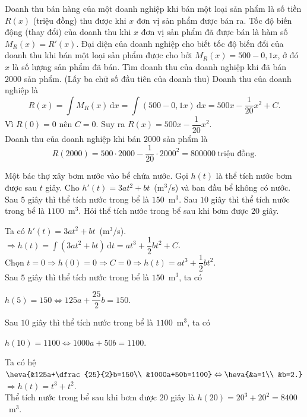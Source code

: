 \begin{ex}%
Doanh thu bán hàng của một doanh nghiệp khi bán một loại sản phẩm là số tiền $R(x)$ (triệu đồng) thu được khi $x$ đơn vị sản phẩm được bán ra. Tốc độ biến động (thay đổi) của doanh thu khi $x$	đơn vị sản phẩm đã được bán là hàm số $M_R(x)=R'(x)$. Đại diện của doanh nghiệp cho biết tốc độ biến đổi của doanh thu khi bán một loại sản phẩm được cho bởi $M_R(x)=500-0{,}1x$, ở đó $x$ là số lượng sản phẩm đã bán. Tìm doanh thu của doanh nghiệp khi đã bán $2000$ sản phẩm. (Lấy ba chữ số đầu tiên của doanh thu)
\loigiai
{
	Doanh thu của doanh nghiệp là $$R(x)=\displaystyle\int M_R(x)\mathrm{\,d}x =\displaystyle\int (500-0{,}1x)\mathrm{\,d}x =500x-\dfrac{1}{20}x^2+C.$$
	Vì $R(0)=0$ nên $C=0$. Suy ra $R(x)=500x-\dfrac{1}{20}x^2$.\\
	Doanh thu của doanh nghiệp khi bán $2000$ sản phẩm là $$R(2000)=500\cdot2000-\dfrac{1}{20}\cdot2000^2=800000~\text{triệu đồng.}$$
}
\end{ex}

\begin{ex}%
Một bác thợ xây bơm nước vào bể chứa nước. Gọi $h(t)$ là thể tích nước bơm được sau $t$ giây. Cho $h'(t)=3at^2+bt$~(m$^3$/s) và ban đầu bể không có nước. Sau $5$ giây thì thể tích nước trong bể là $150$~m$^3$. Sau	$10$ giây thì thể tích nước trong bể là $1100$~m$^3$. Hỏi thể tích nước trong bể sau khi bơm được $20$ giây.
\loigiai
{
	Ta có $h'(t)=3at^2+bt$~(m$^3$/s).\\
	$\Rightarrow h(t)=\displaystyle\int (3at^2+bt)\mathrm{\,d}t=at^3+\dfrac{1}{2}bt^2+C$.\\
	Chọn $t=0\Rightarrow h(0)=0\Rightarrow C=0\Rightarrow h(t)=at^3+\dfrac{1}{2}bt^2$.\\
	Sau $5$ giây thì thể tích nước trong bể là $150$~m$^3$, ta có\\ \centerline{$h(5)=150\Leftrightarrow 125a+\dfrac{25}{2}b=150.$}
	Sau $10$ giây thì thể tích nước trong bể là $1100$~m$^3$, ta có\\
	\centerline{$h(10)=1100\Leftrightarrow 1000a+50b=1100.$}
	Ta có hệ $\heva{&125a+\dfrac{25}{2}b=150\\ &1000a+50b=1100}\Leftrightarrow \heva{&a=1\\ &b=2.}$\\
	$\Rightarrow h(t)=t^3+t^2$.\\
	Thể tích nước trong bể sau khi bơm được $20$ giây là $h(20)=20^3+20^2=8400$~m$^3$.
}
\end{ex}


